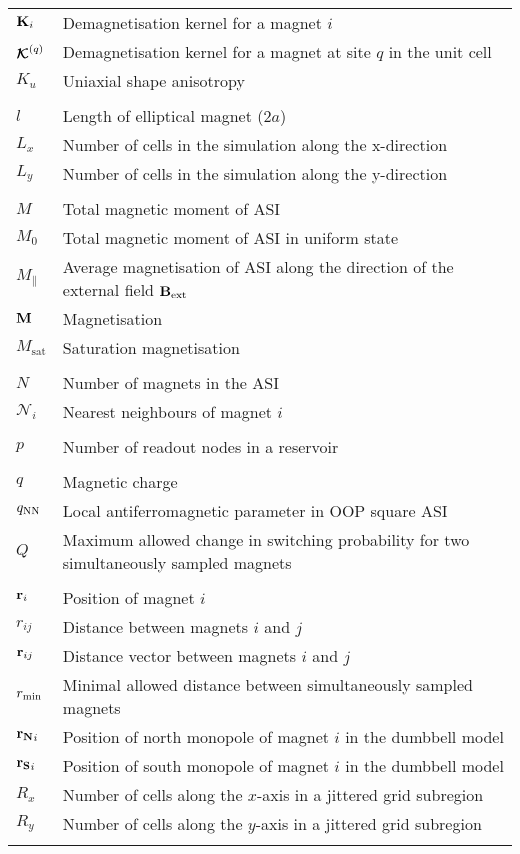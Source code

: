 \begin{longtable}[l]{p{60pt} p{350pt}}
	$\boldsymbol{\mathbf{K}}_i$ & Demagnetisation kernel for a magnet $i$ \\
	$\boldsymbol{\mathbf{\mathcal{K}}}^{(q)}$ & Demagnetisation kernel for a magnet at site $q$ in the unit cell \\
	$K_u$ & Uniaxial shape anisotropy \\
	&\\

	$l$ & Length of elliptical magnet ($2a$) \\
	$L_x$ & Number of cells in the simulation along the x-direction \\
	$L_y$ & Number of cells in the simulation along the y-direction \\
	&\\

	$M$ & Total magnetic moment of ASI \\
	$M_0$ & Total magnetic moment of ASI in uniform state \\
	$M_\parallel$ & Average magnetisation of ASI along the direction of the external field $\boldsymbol{\mathbf{B}}_\mathrm{ext}$ \\
	$\boldsymbol{\mathbf{M}}$ & Magnetisation \\
	$M_\mathrm{sat}$ & Saturation magnetisation \\
	&\\

	$N$ & Number of magnets in the ASI \\ %
	$\mathcal{N}_i$ & Nearest neighbours of magnet $i$ \\
	&\\

	$p$ & Number of readout nodes in a reservoir \\
	&\\

	$q$ & Magnetic charge \\
	$q_\mathrm{NN}$ & Local antiferromagnetic parameter in OOP square ASI \\
	$Q$ & Maximum allowed change in switching probability for two simultaneously sampled magnets \\
	&\\

	$\boldsymbol{\mathbf{r}}_i$ & Position of magnet $i$ \\
	$r_{ij}$ & Distance between magnets $i$ and $j$ \\
	$\boldsymbol{\mathbf{r}}_{ij}$ & Distance vector between magnets $i$ and $j$ \\
	$r_\mathrm{min}$ & Minimal allowed distance between simultaneously sampled magnets \\
	$\boldsymbol{\mathbf{r_N}}_i$ & Position of north monopole of magnet $i$ in the dumbbell model \\
	$\boldsymbol{\mathbf{r_S}}_i$ & Position of south monopole of magnet $i$ in the dumbbell model \\
	$R_x$ & Number of cells along the $x$-axis in a jittered grid subregion \\
	$R_y$ & Number of cells along the $y$-axis in a jittered grid subregion \\
	&\\


\end{longtable}
